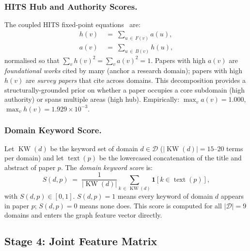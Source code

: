 \documentclass[letterpaper]{article}
\theoremstyle{plain}
\theoremstyle{definition}
\theoremstyle{remark}
\newcommand{\D}{\mathcal{D}}
\newcommand{\hub}[1]{h(#1)}
\newcommand{\auth}[1]{a(#1)}
\newcommand{\Bin}[1]{B(#1)}
\newcommand{\Fout}[1]{F(#1)}
\newcommand{\I}[1]{\mathbf{1}\!\left[#1\right]}
\begin{document}
\subsubsection{HITS Hub and Authority Scores.}
The coupled HITS fixed-point equations~\cite{kleinberg1999} are:
\begin{align}
    \hub{v}  &\;=\; \sum_{u \,\in\, \Fout{v}} \auth{u},
    \label{eq:hub} \\
    \auth{v} &\;=\; \sum_{u \,\in\, \Bin{v}}  \hub{u},
    \label{eq:auth}
\end{align}
normalised so that $\sum_v \hub{v}^2 = \sum_v \auth{v}^2 = 1$.
Papers with high $\auth{v}$ are \emph{foundational works}
cited by many (anchor a research domain);
papers with high $\hub{v}$ are \emph{survey papers} that cite
across domains.
This decomposition provides a structurally-grounded prior
on whether a paper occupies a core subdomain (high authority)
or spans multiple areas (high hub).
Empirically: $\max_v \auth{v} = 1.000$,
$\max_v \hub{v} = 1.929 \times 10^{-3}$.

\subsubsection{Domain Keyword Score.}
Let $\operatorname{KW}(d)$ be the keyword set of domain
$d \in \D$ ($|\operatorname{KW}(d)| = 15\text{--}20$ terms per domain)
and let $\operatorname{text}(p)$ be the lowercased concatenation
of the title and abstract of paper $p$.
The \emph{domain keyword score} is:
\begin{equation}
    S(d, p)
    \;=\;
    \frac{1}{|\operatorname{KW}(d)|}
    \sum_{k \,\in\, \operatorname{KW}(d)}
    \I{k \in \operatorname{text}(p)},
    \label{eq:kws}
\end{equation}
with $S(d,p) \in [0,1]$.
$S(d,p) = 1$ means every keyword of domain $d$ appears
in paper $p$; $S(d,p) = 0$ means none does.
This score is computed for all $|\D|=9$ domains
and enters the graph feature vector directly.

\subsection{Stage 4: Joint Feature Matrix}
\label{sec:features}
\end{document}
